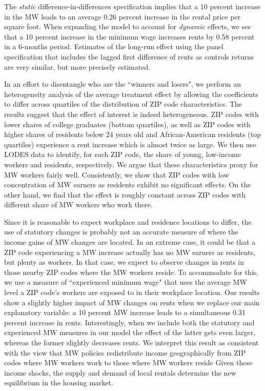The \textit{static} difference-in-differences specification implies that a 10 percent increase 
in the MW leads to an average 0.26 percent increase in the rental price per square foot. When 
expanding the model to account for \textit{dynamic} effects, we see that a 10 percent increase 
in the minimum wage increases rents by 0.58 percent in a 6-months period. Estimates of the 
long-run effect using the panel specification that includes the lagged first difference of rents 
as controls returns are very similar, but more precisely estimated.

In an effort to disentangle who are the ``winners and losers", we perform an heterogeneity 
analysis of the average treatment effect by allowing the coefficients to differ across quartiles 
of the distribution of ZIP code characteristics. The results suggest that the effect of interest 
is indeed heterogeneous. ZIP codes with lower shares of college graduates (bottom quartiles), as 
well as ZIP codes with higher shares of residents below 24 years old and African-American 
residents (top quartiles) experience a rent increase which is almost twice as large. We then use 
LODES data to identify, for each ZIP code, the share of young, low-income workers and residents, 
respectively. We argue that these characteristics proxy for MW workers fairly well. 
Consistently, we show that ZIP codes with low concentration of MW earners as residents 
exhibit no significant effects. On the other hand, we find that the effect is roughly constant 
across ZIP codes with different share of MW workers who work there.

Since it is reasonable to expect workplace and residence locations to differ, the use of 
statutory changes is probably not an accurate measure of where the income gains of MW changes
are located. In an extreme case, it could be that a ZIP code experiencing a MW increase actually 
has no MW earners as residents, but plenty as workers. In that case, we expect to observe 
changes in rents in those nearby ZIP codes where the MW workers reside. To accommodate for 
this, we use a measure of ``experienced minimum wage" that uses the average MW level 
a ZIP code's workers are exposed to in their workplace location. Our results show a slightly 
higher impact of MW changes on rents when we replace our main explanatory variable: a 10 
percent MW increase leads to a simultaneous 0.31 percent increase in rents. Interestingly, 
when we include both the statutory and experienced MW measures in our model the effect of 
the latter gets even larger, whereas the former slightly decreases rents. We interpret this
result as consistent with the view that MW policies redistribute income geographically from ZIP 
codes where MW workers work to those where MW workers reside 
Given these income shocks, the supply and demand of local rentals 
determine the new equilibrium in the housing market.

